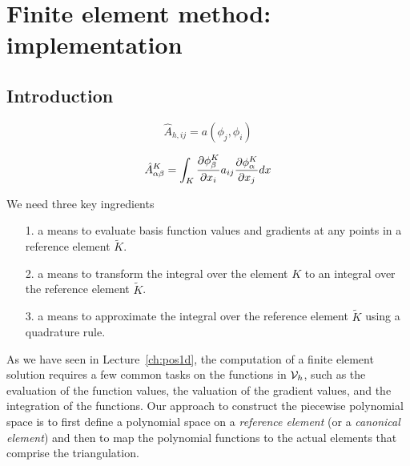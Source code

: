 \chapter{Finite element method: implementation}

\section{Introduction}
\begin{equation*}
  \hat A_{h,ij} = a(\phi_j,\phi_i)
\end{equation*}

\begin{equation*}
  \hat A^K_{\alpha\beta} = \int_K \frac{\partial \phi^K_\beta}{\partial x_i} a_{ij} \frac{\partial \phi^K_\alpha}{\partial x_j} dx
\end{equation*}

We need three key ingredients
\begin{itemize}
\item[1.] a means to evaluate basis function values and gradients at any points in a reference element $\tilde K$.
\item[2.] a means to transform the integral over the element $K$ to an integral over the reference element $\tilde K$.
\item[3.] a means to approximate the integral over the reference element $\tilde K$ using a quadrature rule.
\end{itemize}

As we have seen in Lecture~\ref{ch:pos1d}, the computation of a finite element solution requires a few common tasks on the functions in $\mathcal{V}_h$, such as the evaluation of the function values, the valuation of the gradient values, and the integration of the functions.  Our approach to construct the piecewise polynomial space is to first define a polynomial space on a \emph{reference element} (or a \emph{canonical element}) and then to map the polynomial functions to the actual elements that comprise the triangulation.  


